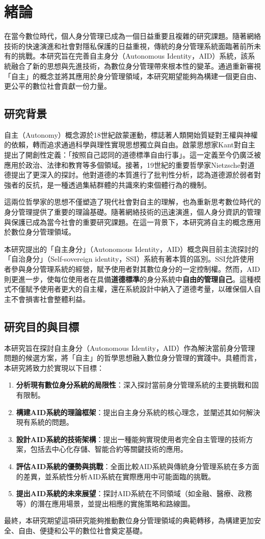 
\chapter{緒論}
在當今數位時代，個人身分管理已成為一個日益重要且複雜的研究課題。隨著網絡技術的快速演進和社會對隱私保護的日益重視，傳統的身分管理系統面臨著前所未有的挑戰。本研究旨在完善自主身分（Autonomous Identity，AID）系統，該系統融合了新的思想與先進技術，為數位身分管理帶來根本性的變革。通過重新審視「自主」的概念並將其應用於身分管理領域，本研究期望能夠為構建一個更自由、更公平的數位社會貢獻一份力量。
\section{研究背景}
自主（Autonomy）概念源於18世紀啟蒙運動，標誌著人類開始質疑對王權與神權的依賴，轉而追求通過科學與理性實現思想獨立與自由。啟蒙思想家Kant\cite{kant1785groundwork}對自主提出了開創性定義：「按照自己認同的道德標準自由行事」。這一定義至今仍廣泛被應用於政治、法律和教育等多個領域。接著，19世紀的重要哲學家Nietzsche\cite{nietzsche1887genealogy}對道德提出了更深入的探討。他對道德的本質進行了批判性分析，認為道德源於弱者對強者的反抗，是一種透過集結群體的共識來約束個體行為的機制。

這兩位哲學家的思想不僅塑造了現代社會對自主的理解，也為重新思考數位時代的身分管理提供了重要的理論基礎。隨著網絡技術的迅速演進，個人身分資訊的管理與保護已成為當今社會的重要研究課題。在這一背景下，本研究將自主的概念應用於數位身分管理領域。

本研究提出的「自主身分」（Autonomous Identity，AID）概念與目前主流探討的「自治身分」（Self-sovereign identity，SSI）系統有著本質的區別。SSI允許使用者參與身分管理系統的經營，賦予使用者對其數位身分的一定控制權。然而，AID則更進一步，使每位使用者在具備\textbf{道德標準}的身分系統中\textbf{自由的管理自己}。這種模式不僅賦予使用者更大的自主權，還在系統設計中納入了道德考量，以確保個人自主不會損害社會整體利益。
\section{研究目的與目標}
本研究旨在探討自主身分（Autonomous Identity，AID）作為解決當前身分管理問題的候選方案，將「自主」的哲學思想融入數位身分管理的實踐中。具體而言，本研究將致力於實現以下目標：
\begin{enumerate}
  \item \textbf{分析現有數位身分系統的局限性}：深入探討當前身分管理系統的主要挑戰和固有限制。
  \item \textbf{構建AID系統的理論框架}：提出自主身分系統的核心理念，並闡述其如何解決現有系統的問題。
  \item \textbf{設計AID系統的技術架構}：提出一種能夠實現使用者完全自主管理的技術方案，包括去中心化存儲、智能合約等關鍵技術的應用。
  \item \textbf{評估AID系統的優勢與挑戰}：全面比較AID系統與傳統身分管理系統在多方面的差異，並系統性分析AID系統在實際應用中可能面臨的挑戰。
  \item \textbf{提出AID系統的未來展望}：探討AID系統在不同領域（如金融、醫療、政務等）的潛在應用場景，並提出相應的實施策略和路線圖。
\end{enumerate}
最終，本研究期望這項研究能夠推動數位身分管理領域的典範轉移，為構建更加安全、自由、便捷和公平的數位社會奠定基礎。
